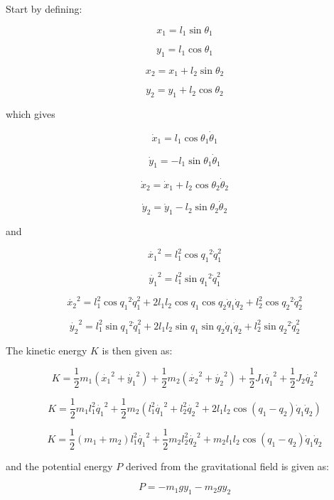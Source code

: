 Start by defining:

$$x_1 = l_1 \sin{\theta_1}$$ 

$$y_1 = l_1 \cos{\theta_1}$$

$$x_2 = x_1 + l_2 \sin{\theta_2}$$

$$y_2 = y_1 + l_2 \cos{\theta_2}$$

\noindent which gives

$$\dot{x}_1 = l_1 \cos{\theta_1} \dot{\theta}_1$$

$$\dot{y}_1 = - l_1 \sin{\theta_1} \dot{\theta}_1$$

$$\dot{x}_2 = \dot{x}_1 + l_2 \cos{\theta_2} \dot{\theta}_2$$

$$\dot{y}_2 = \dot{y}_1 - l_2 \sin{\theta_2} \dot{\theta}_2$$

\noindent and

$$\dot{x_1}^2 = l_1^2 \cos{q_1}^2 \dot{q}_1^2$$

$$\dot{y_1}^2 = l_1^2 \sin{q_1}^2 \dot{q}_1^2$$

$$
\dot{x_2}^2
= l_1^2 \cos{q_1}^2 \dot{q}_1^2
+ 2 l_1 l_2 \cos{q_1} \cos{q_2} \dot{q}_1 \dot{q}_2
+ l_2^2 \cos{q_2}^2 \dot{q}_2^2
$$

$$
\dot{y_2}^2
= l_1^2 \sin{q_1}^2 \dot{q}_1^2
+ 2 l_1 l_2 \sin{q_1} \sin{q_2} \dot{q}_1 \dot{q}_2
+ l_2^2 \sin{q_2}^2 \dot{q}_2^2
$$

The kinetic energy $K$ is then given as:

\begin{equation*}
    K = \frac{1}{2} m_1 (\dot{x_1}^2 + \dot{y_1}^2) + \frac{1}{2} m_2 (\dot{x_2}^2 + \dot{y_2}^2)
    + \frac{1}{2} J_1 \dot{q_1}^2 + \frac{1}{2} J_2 \dot{q_2}^2
\end{equation*}

\begin{equation*}
    K = \frac{1}{2} m_1 l_1^2 \dot{q_1}^2
    + \frac{1}{2} m_2 (l_1^2 \dot{q_1}^2 + l_2^2 \dot{q_2}^2 + 2 l_1 l_2 \cos(q_1 - q_2) \dot{q}_1 \dot{q}_2)
\end{equation*}

\begin{equation}
    K = \frac{1}{2} (m_1 + m_2) l_1^2 \dot{q_1}^2
    + \frac{1}{2} m_2 l_2^2 \dot{q_2}^2 + m_2 l_1 l_2 \cos(q_1 - q_2) \dot{q}_1 \dot{q}_2
    \label{eq:doublependulumkinetic}
\end{equation}

\noindent and the potential energy $P$ derived from the gravitational field is given as:

\begin{equation*}
    P = - m_1 g y_1 - m_2 g y_2
\end{equation*}

